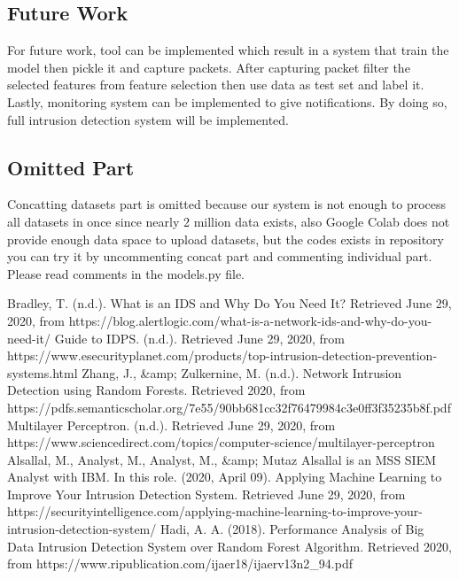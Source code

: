 \documentclass[submission,copyright,creativecommons]{eptcs}
\begin{document}
\subsection{Future Work}
For future work, tool can be implemented which result in a system that train the model then pickle it and capture packets. After capturing packet filter the selected features from feature selection then use data as test set and label it. Lastly, monitoring system can be implemented to give notifications. By doing so, full intrusion detection system will be implemented.
\subsection{Omitted Part}
Concatting datasets part is omitted because our system is not enough to process all datasets in once since nearly 2 million data exists, also Google Colab does not provide enough data space to upload datasets, but the codes exists in repository you can try it by uncommenting concat part and commenting individual part. Please read comments in the models.py file.
\nocite{*}
\begin{thebibliography}{00}
 Bradley, T. (n.d.). What is an IDS and Why Do You Need It? Retrieved June 29, 2020, from https://blog.alertlogic.com/what-is-a-network-ids-and-why-do-you-need-it/
 Guide to IDPS. (n.d.). Retrieved June 29, 2020, from https://www.esecurityplanet.com/products/top-intrusion-detection-prevention-systems.html
 Zhang, J., &amp; Zulkernine, M. (n.d.). Network Intrusion Detection using Random Forests. Retrieved 2020, from https://pdfs.semanticscholar.org/7e55/90bb681cc32f76479984c3e0ff3f35235b8f.pdf
 Multilayer Perceptron. (n.d.). Retrieved June 29, 2020, from https://www.sciencedirect.com/topics/computer-science/multilayer-perceptron
 Alsallal, M., Analyst, M., Analyst, M., &amp; Mutaz Alsallal is an MSS SIEM Analyst with IBM. In this role. (2020, April 09). Applying Machine Learning to Improve Your Intrusion Detection System. Retrieved June 29, 2020, from https://securityintelligence.com/applying-machine-learning-to-improve-your-intrusion-detection-system/
 Hadi, A. A. (2018). Performance Analysis of Big Data Intrusion Detection System over Random Forest Algorithm. Retrieved 2020, from https://www.ripublication.com/ijaer18/ijaerv13n2\_94.pdf
\end{thebibliography}
\end{document}
